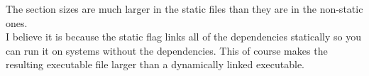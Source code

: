 \documentclass{article}
\begin{document}
The section sizes are much larger in the static files than they are in the non-static ones. \\
I believe it is because the static flag links all of the dependencies statically so you can run it on systems without the dependencies. This of course makes the resulting executable file larger than a dynamically linked executable.
\end{document}
